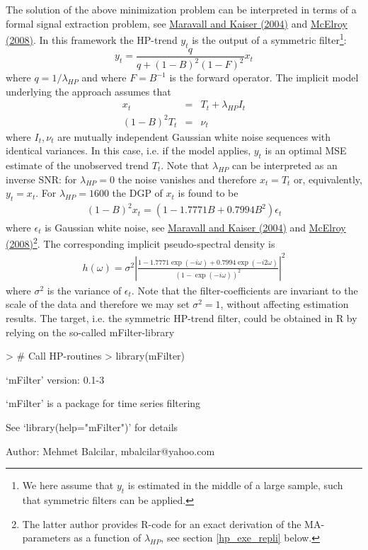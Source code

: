 \documentclass[a4paper]{book}
\begin{document}
The solution of the above minimization problem can be interpreted in terms of a formal signal extraction problem, see 
\href{https://www.dropbox.com/s/dwdx0fcys34g9ku/maravall_kaiser.pdf?dl=0}{Maravall and Kaiser (2004)} and 
\href{https://www.dropbox.com/s/s8zb0buqzygefby/mcelroy_hp.pdf?dl=0}{McElroy (2008)}. In this framework the HP-trend $y_t$ is the output of a symmetric filter\footnote{We here assume that $y_t$ is estimated in the middle of a large sample, such that symmetric filters can be applied.}:
\[y_t=\frac{q}{q+(1-B)^2(1-F)^2}x_t\]
where $q=1/\lambda_{HP}$ and where $F=B^{-1}$ is the forward operator. The implicit model underlying the approach assumes that
\begin{eqnarray*}
x_t&=&T_t+\lambda_{HP} I_t\\
(1-B)^2T_t&=&\nu_t
\end{eqnarray*}
where $I_t,\nu_t$ are mutually independent Gaussian white noise sequences with identical variances. In this case, i.e. if the model applies, $y_t$ is an optimal MSE estimate of the unobserved trend $T_t$. Note that $\lambda_{HP}$ can be interpreted as an inverse SNR: for $\lambda_{HP}=0$ the noise vanishes and therefore $x_t=T_t$ or, equivalently, $y_t=x_t$. For $\lambda_{HP}=1600$ the DGP of $x_t$ is found to be 
\begin{eqnarray}\label{implicit_mode_ass}
(1-B)^2x_t=(1-1.7771B+0.7994B^2)\epsilon_t
\end{eqnarray}
where $\epsilon_t$ is Gaussian white noise, see \href{https://www.dropbox.com/s/dwdx0fcys34g9ku/maravall_kaiser.pdf?dl=0}{Maravall and Kaiser (2004)} and \href{https://www.dropbox.com/s/s8zb0buqzygefby/mcelroy_hp.pdf?dl=0}{McElroy (2008)}\footnote{The latter author provides R-code for an exact derivation of the MA-parameters as a function of $\lambda_{HP}$, see section \ref{hp_exe_repli} below.}. The corresponding implicit pseudo-spectral density is
\begin{eqnarray}\label{hp_pseudo_spec}
h(\omega)=\sigma^2\left|\frac{1-1.7771\exp(-i\omega)+0.7994\exp(-i2\omega)}{(1-\exp(-i\omega))^2}\right|^2
\end{eqnarray}
where $\sigma^2$ is the variance of $\epsilon_t$. Note that the filter-coefficients are invariant to the scale of the data  and therefore we may set $\sigma^2=1$, without affecting estimation results. The target, i.e. the symmetric HP-trend filter, could be obtained in R by relying on the so-called mFilter-library 
\begin{Schunk}
\begin{Sinput}
> # Call HP-routines
> library(mFilter)
\end{Sinput}
\begin{Soutput}
    ‘mFilter’ version: 0.1-3

    ‘mFilter’ is a package for time series filtering

    See ‘library(help="mFilter")’ for details

    Author: Mehmet Balcilar, mbalcilar@yahoo.com
\end{Soutput}
\end{Schunk}
\end{document}
